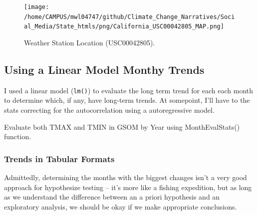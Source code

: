 \documentclass{article}
\begin{document}
\begin{figure}
\texttt{[image: /home/CAMPUS/mwl04747/github/Climate\_Change\_Narratives/Social\_Media/State\_htmls/png/California\_USC00042805\_MAP.png]}
\caption{Weather Station Location (USC00042805). }
\label{fig:Map}
\end{figure}

\subsection{Using a Linear Model Monthy Trends}

I used a linear model (\texttt{lm()}) to evaluate the long term trend for each each month to determine which, if any, have long-term trends. At somepoint, I'll have to the stats correcting for the autocorrelation using a autoregressive model.  

\begin{knitrout}
\color{fgcolor}\begin{kframe}


{\ttfamily\noindent\bfseries\color{errorcolor}{\#\# Error in is.data.frame(data): object 'GSOM' not found}}

{\ttfamily\noindent{}}\end{kframe}
\end{knitrout}

Evaluate both TMAX and TMIN in GSOM by Year using MonthEvalStats() function. 

\begin{knitrout}
\color{fgcolor}\begin{kframe}


{\ttfamily\noindent\bfseries\color{errorcolor}{\#\# Error in is.data.frame(data): object 'GSOM' not found}}\end{kframe}
\end{knitrout}


\subsubsection{Trends in Tabular Formats}

Admittedly, determining the months with the biggest changes isn't a very good approach for hypothesize testing -- it's more like a fishing expedition, but as long as we understand the difference between an a priori hypothesis and an exploratory analysis, we should be okay if we make appropriate conclusions. 
\end{document}

